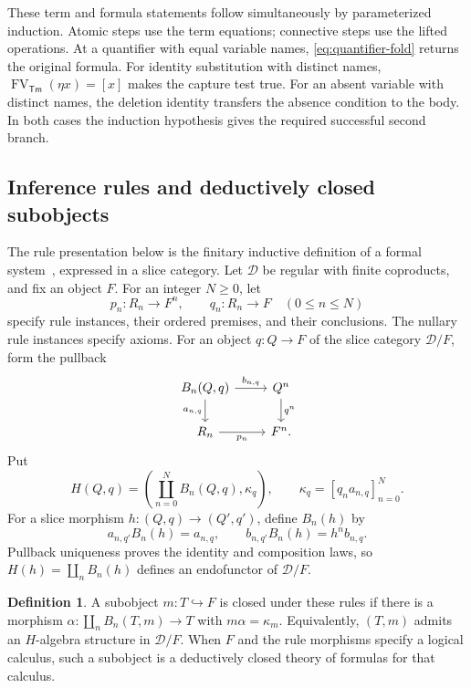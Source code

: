 \documentclass[11pt]{article}
\theoremstyle{definition}\newtheorem{definition}[theorem]{Definition}
\newcommand{\Tm}{\mathsf{Tm}}
\newcommand{\FV}{\operatorname{FV}}
\begin{document}
These term and formula statements follow simultaneously by
parameterized induction. Atomic steps use the term equations;
connective steps use the lifted operations. At a quantifier with
equal variable names, \eqref{eq:quantifier-fold} returns the original
formula. For identity substitution with distinct names,
$\FV_{\Tm}(\eta x)=[x]$ makes the capture test true.
For an absent variable with distinct names, the deletion identity
transfers the absence condition to the body. In both cases the
induction hypothesis gives the required successful second branch.

\subsection{Inference rules and deductively closed subobjects}
\label{app:closed-subobjects}

The rule presentation below is the finitary inductive definition of a
formal system~\cite[Section 1.1]{Aczel}, expressed in a slice category.
Let $\mathcal D$ be regular with finite coproducts, and fix an object
$F$. For an integer $N\geq0$, let
\[
 p_n:R_n\longrightarrow F^n,\qquad
 q_n:R_n\longrightarrow F\quad(0\leq n\leq N)
\]
specify rule instances, their ordered premises, and their conclusions.
The nullary rule instances specify axioms.
For an object $q:Q\to F$ of the slice category $\mathcal D/F$,
form the pullback
\[
\begin{tikzcd}
 B_n(Q,q)\arrow[r,"{b_{n,q}}"]\arrow[d,"{a_{n,q}}"'] &
 Q^n\arrow[d,"q^n"]\\
 R_n\arrow[r,"p_n"'] & F^n.
\end{tikzcd}
\]
Put
\[
 H(Q,q)=\left(\coprod_{n=0}^N B_n(Q,q),\kappa_q\right),\qquad
 \kappa_q=[q_na_{n,q}]_{n=0}^N.
\]
For a slice morphism $h:(Q,q)\to(Q',q')$, define $B_n(h)$ by
\[
 a_{n,q'}B_n(h)=a_{n,q},\qquad
 b_{n,q'}B_n(h)=h^n b_{n,q}.
\]
Pullback uniqueness proves the identity and composition laws, so
$H(h)=\coprod_nB_n(h)$ defines an endofunctor of $\mathcal D/F$.

\begin{definition}\label{def:deductively-closed}
A subobject $m:T\hookrightarrow F$ is closed under these rules if
there is a morphism $\alpha:\coprod_nB_n(T,m)\to T$ with
$m\alpha=\kappa_m$. Equivalently, $(T,m)$ admits an $H$-algebra
structure in $\mathcal D/F$. When $F$ and the rule morphisms specify
a logical calculus, such a subobject is a deductively closed theory
of formulas for that calculus.
\end{definition}
\end{document}
